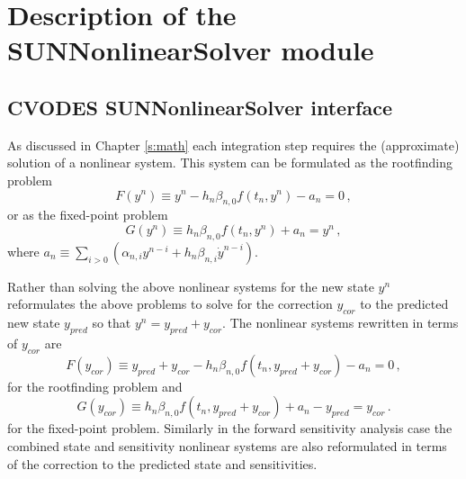 \chapter{Description of the SUNNonlinearSolver module}\label{c:sunnonlinsol}


\section{CVODES SUNNonlinearSolver interface}
\label{s:sunnonlinsol_interface}

As discussed in Chapter \ref{s:math} each integration step requires the
(approximate) solution of a nonlinear system. This system can be formulated as
the rootfinding problem
\begin{equation}
  F(y^n) \equiv y^n - h_n \beta_{n,0} f(t_n,y^n) - a_n = 0 \, ,
\end{equation}
or as the fixed-point problem
\begin{equation}
  G(y^n) \equiv h_n \beta_{n,0} f(t_n,y^n) + a_n = y^n \, ,
\end{equation}
where $a_n\equiv\sum_{i>0}(\alpha_{n,i}y^{n-i}+h_n\beta_{n,i} {\dot{y}}^{n-i})$.

Rather than solving the above nonlinear systems for the new state $y^n$
{\cvodes} reformulates the above problems to solve for the correction $y_{cor}$
to the predicted new state $y_{pred}$ so that $y^n = y_{pred} + y_{cor}$.
The nonlinear systems rewritten in terms of $y_{cor}$ are
\begin{equation}
  F(y_{cor}) \equiv y_{pred} + y_{cor} - h_n \beta_{n,0} f(t_n, y_{pred} + y_{cor}) - a_n = 0 \, ,
\end{equation}
for the rootfinding problem and
\begin{equation}
  G(y_{cor}) \equiv h_n \beta_{n,0} f(t_n, y_{pred} + y_{cor}) + a_n
  - y_{pred} = y_{cor} \, .
\end{equation}
for the fixed-point problem.
Similarly in the forward sensitivity analysis case the combined state and
sensitivity nonlinear systems are also reformulated in terms of the correction
to the predicted state and sensitivities.

